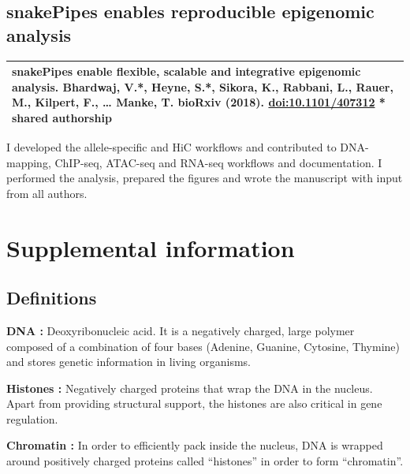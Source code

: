 \documentclass[11pt,twoside]{MPIthesis}
\theoremstyle{definition}
\theoremstyle{definition}
\theoremstyle{definition}
\theoremstyle{remark}
\begin{document}


\section{snakePipes enables reproducible epigenomic
analysis}\label{snakepipes-enables-reproducible-epigenomic-analysis}
\begin{longtable}[]{@{}l@{}}
\toprule
\begin{minipage}[t]{0.97\columnwidth}\raggedright\strut
\textbf{snakePipes enable flexible, scalable and integrative epigenomic
analysis.} \textbf{Bhardwaj, V.*}, Heyne, S.*, Sikora, K., Rabbani, L.,
Rauer, M., Kilpert, F., \ldots{} Manke, T. \textbf{bioRxiv (2018).}
\url{doi:10.1101/407312} * shared authorship\strut
\end{minipage}\tabularnewline
\bottomrule
\end{longtable}
I developed the allele-specific and HiC workflows and contributed to
DNA-mapping, ChIP-seq, ATAC-seq and RNA-seq workflows and documentation.
I performed the analysis, prepared the figures and wrote the manuscript
with input from all authors.



\chapter{Supplemental information}\label{supplemental-information}

\clearpage

\section{Definitions}\label{definitions}

\textbf{DNA :} Deoxyribonucleic acid. It is a negatively charged, large
polymer composed of a combination of four bases (Adenine, Guanine,
Cytosine, Thymine) and stores genetic information in living organisms.

\textbf{Histones :} Negatively charged proteins that wrap the DNA in the
nucleus. Apart from providing structural support, the histones are also
critical in gene regulation.

\textbf{Chromatin :} In order to efficiently pack inside the nucleus,
DNA is wrapped around positively charged proteins called ``histones'' in
order to form ``chromatin''.
\end{document}
